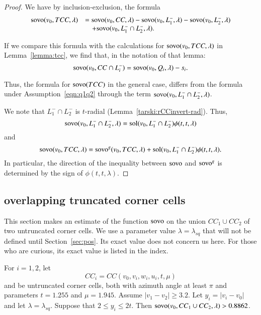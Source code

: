 \begin{proof}
We have by inclusion-exclusion, the formula
$$
\begin{array}{lll}
{\operatorname{sovo}}(v_0,TCC,\lambda) &=
{\operatorname{sovo}}(v_0,CC,\lambda) -
{\operatorname{sovo}}(v_0, L_1^-,\lambda) -
{\operatorname{sovo}}(v_0, L_2^-,\lambda) \\
 &\quad +
{\operatorname{sovo}}(v_0, L_1^- \cap L_2^-,\lambda).
\end{array}
$$

If we compare this formula with the calculations for 
${\operatorname{sovo}}(v_0,TCC,\lambda)$ in Lemma~\ref{lemma:tcc}, 
we find that, in the notation of that lemma:
$$
{\operatorname{sovo}}(v_0,CC\cap L_i^-) = {\operatorname{sovo}}(v_0,Q_i,\lambda) - s_i.
$$

Thus, the formula for ${\operatorname{sovo}}(TCC)$ in the general case,
differs from the formula under Assumption~\ref{eqn:q1q2} through
the term ${\operatorname{sovo}}(v_0,L_1^-\cap L_2^-,\lambda)$.

We note that $L_1^-\cap L_2^-$ is $t$-radial 
(Lemma~\ref{tarski:rCCinvert-rad}).  Thus,
$$
{\operatorname{sovo}}(v_0,L_1^-\cap L_2^-,\lambda) =
\operatorname{sol}(v_0, L_1^-\cap L_2^-)\phi(t,t,\lambda)
$$
and
$$
{\operatorname{sovo}}(v_0,TCC,\lambda) = {\operatorname{sovo}}^g(v_0,TCC,\lambda) +
   \operatorname{sol}(v_0,L_1^-\cap L_2^-) \phi(t,t,\lambda).
$$
In particular, the direction of the inequality between
${\operatorname{sovo}}$ and ${\operatorname{sovo}}^g$ is determined by the sign
of $\phi(t,t,\lambda)$.
\end{proof}



\subsection{overlapping truncated corner cells}



This section makes an estimate of the function ${\operatorname{sovo}}$
on the union $CC_1\cup CC_2$ of two untruncated corner cells.
We use a parameter value $\lambda=\lambda_{sq}$ that will
not be defined until Section~\ref{sec:pos}.  Its exact value
does not concern us here.    For those who are curious, its
exact value is listed in the index.


\begin{lemma} 
For $i=1,2$, let $$CC_i =CC(v_0,v_i,w_i,u_i,t,\mu)$$ and 
be untruncated corner cells, both
with azimuth angle at least $\pi$ and parameters $t=1.255$ and 
$\mu=1.945$.
Assume $|v_1-v_2|\ge 3.2$.  Let $y_i =|v_i-v_0|$ and
let $\lambda = \lambda_{sq}$.
Suppose that
$2\le y_i\le 2t$.  Then
${\operatorname{sovo}}(v_0,CC_1\cup CC_2,\lambda) > 0.8862$.
\end{lemma}

